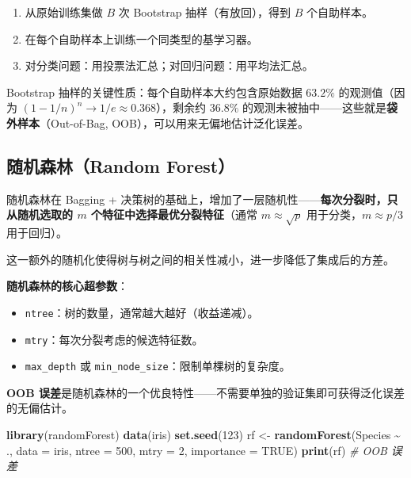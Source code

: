 \documentclass[
]{book}
\newenvironment{Shaded}{\begin{snugshade}}{\end{snugshade}}
\newcommand{\AttributeTok}[1]{\textcolor[rgb]{0.13,0.29,0.53}{#1}}
\newcommand{\CommentTok}[1]{\textcolor[rgb]{0.56,0.35,0.01}{\textit{#1}}}
\newcommand{\ConstantTok}[1]{\textcolor[rgb]{0.56,0.35,0.01}{#1}}
\newcommand{\DecValTok}[1]{\textcolor[rgb]{0.00,0.00,0.81}{#1}}
\newcommand{\FunctionTok}[1]{\textcolor[rgb]{0.13,0.29,0.53}{\textbf{#1}}}
\newcommand{\NormalTok}[1]{#1}
\newcommand{\OtherTok}[1]{\textcolor[rgb]{0.56,0.35,0.01}{#1}}
\newcommand{\SpecialCharTok}[1]{\textcolor[rgb]{0.81,0.36,0.00}{\textbf{#1}}}
\providecommand{\tightlist}{%
  \setlength{\itemsep}{0pt}\setlength{\parskip}{0pt}}
\begin{document}
\begin{enumerate}
\def\labelenumi{\arabic{enumi}.}
\tightlist
\item
  从原始训练集做 \(B\) 次 Bootstrap 抽样（有放回），得到 \(B\) 个自助样本。
\item
  在每个自助样本上训练一个同类型的基学习器。
\item
  对分类问题：用投票法汇总；对回归问题：用平均法汇总。
\end{enumerate}

Bootstrap 抽样的关键性质：每个自助样本大约包含原始数据 \(63.2\%\) 的观测值（因为 \((1 - 1/n)^n \to 1/e \approx 0.368\)），剩余约 \(36.8\%\) 的观测未被抽中------这些就是\textbf{袋外样本}（Out-of-Bag, OOB），可以用来无偏地估计泛化误差。

\subsection{随机森林（Random Forest）}\label{ux968fux673aux68eeux6797random-forest}

随机森林在 Bagging + 决策树的基础上，增加了一层随机性------\textbf{每次分裂时，只从随机选取的 \(m\) 个特征中选择最优分裂特征}（通常 \(m \approx \sqrt{p}\) 用于分类，\(m \approx p/3\) 用于回归）。

这一额外的随机化使得树与树之间的相关性减小，进一步降低了集成后的方差。

\textbf{随机森林的核心超参数}：

\begin{itemize}
\tightlist
\item
  \texttt{ntree}：树的数量，通常越大越好（收益递减）。
\item
  \texttt{mtry}：每次分裂考虑的候选特征数。
\item
  \texttt{max\_depth} 或 \texttt{min\_node\_size}：限制单棵树的复杂度。
\end{itemize}

\textbf{OOB 误差}是随机森林的一个优良特性------不需要单独的验证集即可获得泛化误差的无偏估计。

\begin{Shaded}
\begin{Highlighting}[]
\FunctionTok{library}\NormalTok{(randomForest)}
\FunctionTok{data}\NormalTok{(iris)}
\FunctionTok{set.seed}\NormalTok{(}\DecValTok{123}\NormalTok{)}
\NormalTok{rf }\OtherTok{\textless{}{-}} \FunctionTok{randomForest}\NormalTok{(Species }\SpecialCharTok{\textasciitilde{}}\NormalTok{ ., }\AttributeTok{data =}\NormalTok{ iris, }\AttributeTok{ntree =} \DecValTok{500}\NormalTok{, }\AttributeTok{mtry =} \DecValTok{2}\NormalTok{, }\AttributeTok{importance =} \ConstantTok{TRUE}\NormalTok{)}
\FunctionTok{print}\NormalTok{(rf)                  }\CommentTok{\# OOB 误差}
\end{Highlighting}
\end{Shaded}
\end{document}
